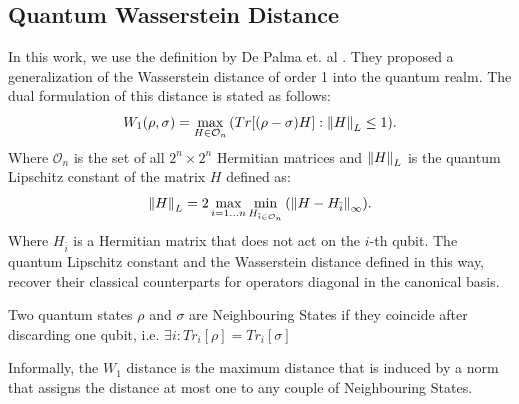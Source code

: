 \subsection{Quantum Wasserstein Distance}
In this work, we use the definition by De Palma et.
al \cite{depalma2020quantum}. They proposed a generalization of the
Wasserstein distance of order 1 into the quantum realm. The dual formulation of
this distance is stated as follows:
\begin{equation}
  W_1(\rho, \sigma) = \max_{H \in \mathcal{O}_n}{(Tr[(\rho - \sigma)H]: \left\lVert H\right\rVert_L \leq 1
    )}.
  \label{eq:w1_distance_general}
\end{equation}
Where $\mathcal{O}_n$ is the set of all $2^n \times 2^n$ Hermitian matrices and 
$\left\lVert H\right\rVert_L$ is the quantum Lipschitz constant of the matrix $H$ defined as:
\begin{equation}
  \left\lVert H\right\rVert_L = 2 \max_{i=1\ldots n}{\min_{H_{\bar{i} \in \mathcal{O}_n}}{(\left\lVert H - H_{\bar{i}}\right\rVert_\infty)}}.
  \label{eq:quantum_lipschitz_constant}
\end{equation}
Where $H_{\bar{i}}$ is a Hermitian matrix that does not act on the $i$-th qubit.
The quantum Lipschitz constant and the Wasserstein distance defined in this way,
recover their classical counterparts for operators diagonal in the canonical basis.

\begin{definition}
  Two quantum states $\rho$ and $\sigma$ are Neighbouring States if they
  coincide after discarding one qubit, i.e. $\exists i: Tr_i[\rho]=Tr_i[\sigma]$
\end{definition}

Informally, the $W_1$ distance is the maximum distance that is induced by a norm
that assigns the distance at most one to any couple of Neighbouring States. 

